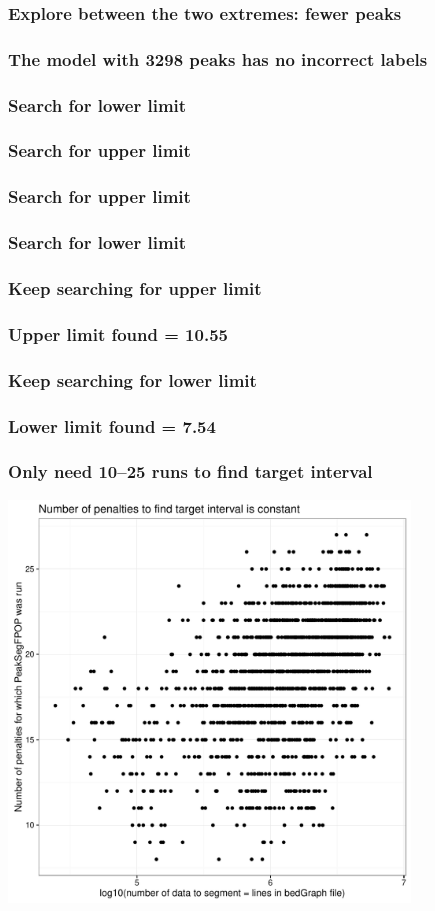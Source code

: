 \documentclass{beamer}
\begin{document}
\begin{frame}
  \frametitle{Explore between the two extremes: fewer peaks}
\end{frame}

\begin{frame}
  \frametitle{The model with 3298 peaks has no incorrect labels }
\end{frame}

\begin{frame}
  \frametitle{Search for lower limit}
\end{frame}

\begin{frame}
  \frametitle{Search for upper limit}
\end{frame}

\begin{frame}
  \frametitle{Search for upper limit}
\end{frame}

\begin{frame}
  \frametitle{Search for lower limit}
\end{frame}


\begin{frame}
  \frametitle{Keep searching for upper limit}
\end{frame}

\begin{frame}
  \frametitle{Upper limit found = 10.55}
\end{frame}
 
\begin{frame}
  \frametitle{Keep searching for lower limit}
\end{frame}

\begin{frame}
  \frametitle{Lower limit found = 7.54}
\end{frame}

\begin{frame}
  \frametitle{Only need 10--25 runs to find target interval}
  \includegraphics[width=0.8\textwidth]{figure-timing-data-penalties}
\end{frame}
\end{document}

